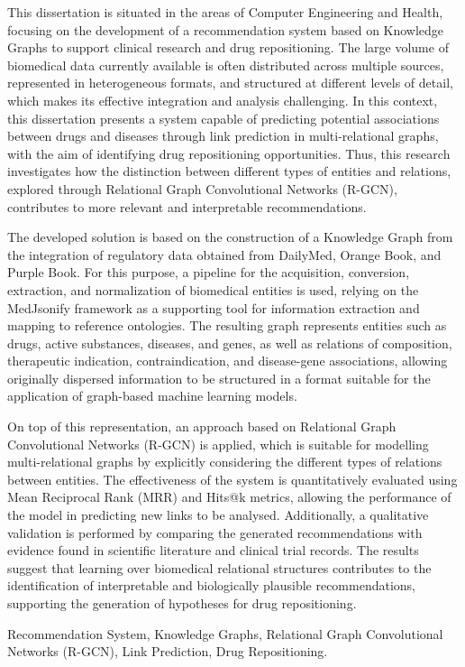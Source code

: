 This dissertation is situated in the areas of Computer Engineering and Health, focusing on the development of a recommendation system based on Knowledge Graphs to support clinical research and drug repositioning. The large volume of biomedical data currently available is often distributed across multiple sources, represented in heterogeneous formats, and structured at different levels of detail, which makes its effective integration and analysis challenging. In this context, this dissertation presents a system capable of predicting potential associations between drugs and diseases through link prediction in multi-relational graphs, with the aim of identifying drug repositioning opportunities. Thus, this research investigates how the distinction between different types of entities and relations, explored through Relational Graph Convolutional Networks (R-GCN), contributes to more relevant and interpretable recommendations.

The developed solution is based on the construction of a Knowledge Graph from the integration of regulatory data obtained from DailyMed, Orange Book, and Purple Book. For this purpose, a pipeline for the acquisition, conversion, extraction, and normalization of biomedical entities is used, relying on the MedJsonify framework as a supporting tool for information extraction and mapping to reference ontologies. The resulting graph represents entities such as drugs, active substances, diseases, and genes, as well as relations of composition, therapeutic indication, contraindication, and disease-gene associations, allowing originally dispersed information to be structured in a format suitable for the application of graph-based machine learning models.

On top of this representation, an approach based on Relational Graph Convolutional Networks (R-GCN) is applied, which is suitable for modelling multi-relational graphs by explicitly considering the different types of relations between entities. The effectiveness of the system is quantitatively evaluated using Mean Reciprocal Rank (MRR) and Hits@k metrics, allowing the performance of the model in predicting new links to be analysed. Additionally, a qualitative validation is performed by comparing the generated recommendations with evidence found in scientific literature and clinical trial records. The results suggest that learning over biomedical relational structures contributes to the identification of interpretable and biologically plausible recommendations, supporting the generation of hypotheses for drug repositioning.


\begin{keywords}
Recommendation System, Knowledge Graphs, Relational Graph Convolutional Networks (R-GCN), Link Prediction, Drug Repositioning.
\end{keywords} 
